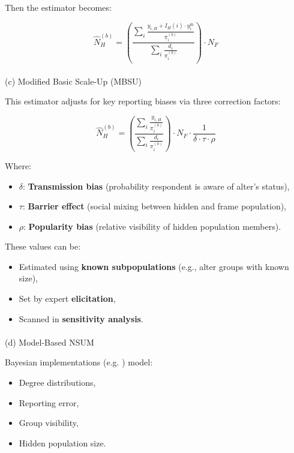 \documentclass[
  12pt,
  letterpaper,
  DIV=11,
  numbers=noendperiod]{scrartcl}
\makeatletter
\let\oldparagraph\paragraph
\renewcommand{\paragraph}{
    \@ifstar
      \xxxParagraphStar
      \xxxParagraphNoStar
  }
\newcommand{\xxxParagraphStar}[1]{\oldparagraph*{#1}\mbox{}}
\newcommand{\xxxParagraphNoStar}[1]{\oldparagraph{#1}\mbox{}}
\theoremstyle{plain}
\theoremstyle{definition}
\makeatother
\begin{document}
Then the estimator becomes:

\[\hat{N}_H^{(b)} = \left( \frac{\sum_{i} \frac{y_{i,H} + I_H(i) \cdot y_{i}^{\text{in}}}{\pi_i^{(b)}}}{\sum_{i} \frac{d_i}{\pi_i^{(b)}}} \right) \cdot N_F\]

\paragraph{(c) Modified Basic Scale-Up
(MBSU)}\label{c-modified-basic-scale-up-mbsu}

This estimator adjusts for key reporting biases via three correction
factors:

\[\hat{N}_H^{(b)} = \left( \frac{\sum_{i} \frac{y_{i,H}}{\pi_i^{(b)}}}{\sum_{i} \frac{d_i}{\pi_i^{(b)}}} \right) \cdot N_F \cdot \frac{1}{\delta \cdot \tau \cdot \rho}\]

Where:

\begin{itemize}
\item
  \(\delta\): \textbf{Transmission bias} (probability respondent is
  aware of alter's status),
\item
  \(\tau\): \textbf{Barrier effect} (social mixing between hidden and
  frame population),
\item
  \(\rho\): \textbf{Popularity bias} (relative visibility of hidden
  population members).
\end{itemize}

These values can be:

\begin{itemize}
\item
  Estimated using \textbf{known subpopulations} (e.g., alter groups with
  known size),
\item
  Set by expert \textbf{elicitation},
\item
  Scanned in \textbf{sensitivity analysis}.
\end{itemize}

\paragraph{(d) Model-Based NSUM}\label{d-model-based-nsum}

Bayesian implementations (e.g. \textcite{malt15-estimating}) model:

\begin{itemize}
\item
  Degree distributions,
\item
  Reporting error,
\item
  Group visibility,
\item
  Hidden population size.
\end{itemize}
\end{document}
